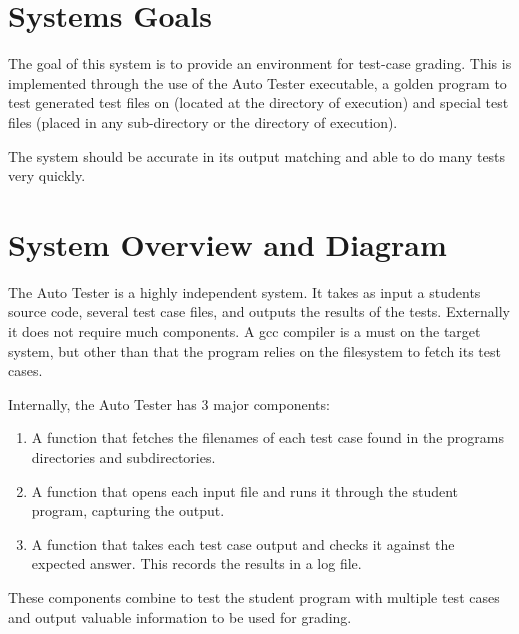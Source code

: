 \section{Systems Goals}
The goal of this system is to provide an environment for test-case grading. This is implemented through the use of the Auto Tester executable, a golden program to test generated test files on (located at the directory of execution) and special test files (placed in any sub-directory or the directory of execution).

The system should be accurate in its output matching and able to do many tests very quickly.

\section{System Overview and Diagram}
The Auto Tester is a highly independent system. It takes as input a students source code, several test case files, and outputs the results of the tests. Externally it does not require much components. A gcc compiler is a must on the target system, but other than that the program relies on the filesystem to fetch its test cases.

Internally, the Auto Tester has 3 major components:
\begin{enumerate}
    \item A function that fetches the filenames of each test case found in the programs directories and subdirectories.
    \item A function that opens each input file and runs it through the student program, capturing the output.
    \item A function that takes each test case output and checks it against the expected answer. This records the results in a log file.
\end{enumerate}

These components combine to test the student program with multiple test cases and output valuable information to be used for grading.


